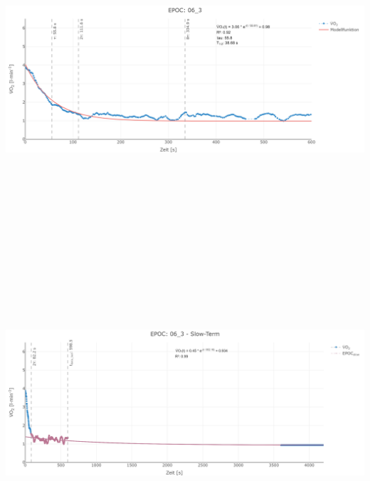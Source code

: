 \documentclass[
  letterpaper,
  DIV=11]{scrartcl}
\begin{document}
\includegraphics[width=11.45833in,height=4.6875in]{images/06_3_tau.png}
\includegraphics[width=11.45833in,height=4.6875in]{images/06_3_slow.png}
\end{document}
